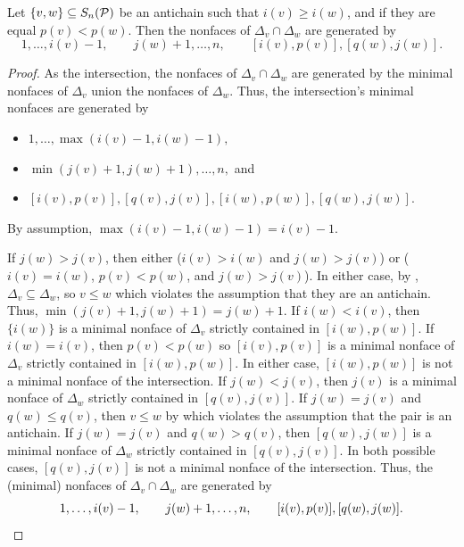\begin{corollary}
\label{lem:double pruned intersections}
    Let $\{v,w\}\subseteq S_n(\mathcal{P})$ be an antichain such that $i(v)\geq i(w)$, and if they are equal $p(v)< p(w)$. Then the nonfaces of $\Delta_v\cap\Delta_w$  are generated by 
    \[1,\dots,i(v)-1,\qquad j(w)+1,\dots,n,\qquad [i(v),p(v)],  [q(w),j(w)].\]
\end{corollary}
\begin{proof}
    As the intersection, the nonfaces of $\Delta_v\cap \Delta_w$ are generated by the minimal nonfaces of $\Delta_v$ union the nonfaces of $\Delta_w$.
    Thus, the intersection's minimal nonfaces are generated by 
    \begin{itemize}
        \item $1,\dots,\max(i(v)-1,i(w)-1),$
        \item $\min(j(v)+1,j(w)+1),\dots,n,$ and
        \item $[i(v),p(v)], [q(v),j(v)],[i(w),p(w)], [q(w),j(w)].$
    \end{itemize}
    By assumption, $\max(i(v)-1,i(w)-1) = i(v)-1$.
    
    If $j(w)>j(v)$, then either ($i(v)>i(w)$ and  $j(w)>j(v)$) or ($i(v)=i(w)$, $p(v)< p(w)$, and  $j(w)>j(v)$).
    In either case, by , $\Delta_v\subseteq  \Delta_w$, so $v\leq w$ which violates the assumption that they are an antichain.
    Thus, $\min(j(v)+1,j(w)+1)=j(w)+1$.
    If $i(w)<i(v)$, then $\{i(w)\}$ is a minimal nonface of $\Delta_v$ strictly contained in $[i(w),p(w)]$.
    If $i(w)=i(v)$, then $p(v)<p(w)$ so $[i(v),p(v)]$ is a minimal nonface of $\Delta_v$ strictly contained in $[i(w),p(w)]$.
    In either case, $[i(w),p(w)]$ is not a minimal nonface of the intersection.
    If $j(w)<j(v)$, then $j(v)$ is a minimal nonface of $\Delta_w$ strictly contained in $[q(v),j(v)]$.
    If $j(w)=j(v)$ and $q(w)\leq q(v)$, then $v\leq w$ by  which violates the assumption that the pair is an antichain.
    If $j(w)=j(v)$ and $q(w)> q(v)$,
    then $[q(w),j(w)]$ is a minimal nonface of $\Delta_w$ strictly contained in $[q(v),j(v)]$.
    In both possible cases, $[q(v),j(v)]$ is not a minimal nonface of the intersection.
    Thus, the (minimal) nonfaces of $\Delta_v\cap \Delta_w$ are generated by
    \[1,\dots,i(v)-1,\qquad j(w)+1,\dots,n,\qquad [i(v),p(v)],  [q(w),j(w)].\qedhere\]
\end{proof}


